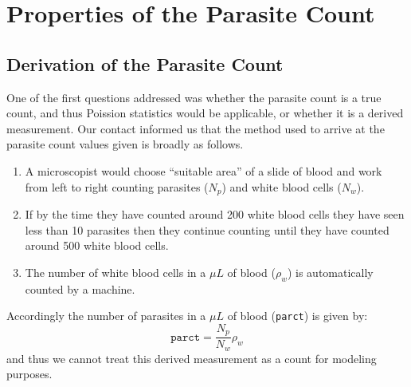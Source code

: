 \section{Properties of the Parasite Count}
\subsection{Derivation of the Parasite Count}
One of the first questions addressed was whether the parasite count is a true count, and thus Poission statistics would be applicable, or whether it is a derived measurement. Our contact informed us that the method used to arrive at the parasite count values given is broadly as follows.
\begin{enumerate}
 \item A microscopist would choose ``suitable area'' of a slide of blood and work from left to right counting parasites ($N_p$) and white blood cells ($N_w$).
\item If by the time they have counted around 200 white blood cells they have seen less than 10 parasites then they continue counting until they have counted around 500 white blood cells.
\item The number of white blood cells in a $\mu L$ of blood ($\rho_w$) is automatically counted by a machine.
\end{enumerate}
Accordingly the number of parasites in a $\mu L$ of blood (\texttt{parct}) is given by:
$$\mathtt{parct}=\frac{N_p}{N_w}\rho_w$$
and thus we cannot treat this derived measurement as a count for modeling purposes.
